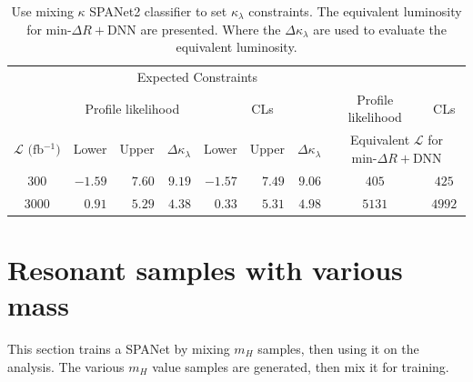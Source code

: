 \documentclass[12pt]{article}
\begin{document}
	\begin{table}[htpb]
		\centering
		\caption{Use mixing $\kappa$ SPANet2 classifier to set $\kappa_\lambda$ constraints. The equivalent luminosity for $\text{min-}\Delta R + \text{DNN}$ are presented. Where the $\Delta \kappa_\lambda$ are used to evaluate the equivalent luminosity.}
		\label{tab:kappa_constraint_equivalent_luminosity}
		\begin{tabular}{c|rrr|rrr|c|c}
		     & \multicolumn{6}{c|}{Expected Constraints}                           &                    &       \\
			 & \multicolumn{3}{c|}{Profile likelihood} & \multicolumn{3}{c|}{CLs}  & Profile likelihood & CLs   \\ \hline
		$\mathcal{L}\text{ (fb$^{-1}$)}$ & Lower   & Upper  & $\Delta\kappa_\lambda$ & Lower   & Upper  & $\Delta\kappa_\lambda$ & \multicolumn{2}{c}{Equivalent $\mathcal{L}$ for $\text{min-}\Delta R + \text{DNN}$} \\ \hline
		300  & $-1.59$ & $7.60$ & $9.19$ & $-1.57$ & $7.49$ & $9.06$ & $405$  & $425$  \\
		3000 & $0.91$  & $5.29$ & $4.38$ & $0.33$  & $5.31$ & $4.98$ & $5131$ & $4992$ \\
		\end{tabular}
	\end{table}
\section{Resonant samples with various mass}%
\label{sec:resonant_samples_with_various_mass}
	
	
	This section trains a SPANet by mixing $m_H$ samples, then using it on the analysis. The various $m_H$ value samples are generated, then mix it for training.
\end{document}
